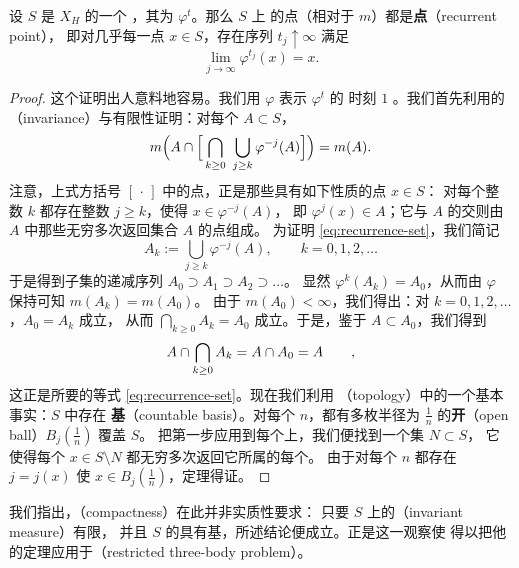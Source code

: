 \begin{theorem}\label{thm:poincare-recurrence}
设 $S$ 是\trHamiltonianVectorField{} $X_{H}$ 的一个%
\trCompact\trRegular\trEnergySurface，其\trFlow{}为 $\varphi^{t}$。那么 $S$ 上%
\trAlmostEvery{}的点（相对于 $m$）都是\textbf{\trRecurrence{}点}（recurrent point），%
即对几乎每一点 $x\in S$，存在序列 $t_{j}\uparrow\infty$ 满足
\[
\lim_{j\to\infty}\varphi^{t_{j}}(x)=x.
\]
\end{theorem}
\begin{proof}
这个证明出人意料地容易。我们用 $\varphi$ 表示\trFlow{} $\varphi^{t}$ 的%
时刻 $1$ \trMapping。我们首先利用\trMeasure{}的%
\textbf{\trInvariance}（invariance）与有限性证明：对每个 $A\subset S$，
\begin{equation}\label{eq:recurrence-set}
m\Bigl(A\cap\Bigl[\,\bigcap_{k\geq0}\ \bigcup_{j\geq k}\varphi^{-j}(A)\Bigr]\Bigr)=m(A).
\end{equation}
注意，上式方括号 $[\,\cdot\,]$ 中的点，正是那些具有如下性质的点 $x\in S$：%
对每个整数 $k$ 都存在整数 $j\geq k$，使得 $x\in\varphi^{-j}(A)$，%
即 $\varphi^{j}(x)\in A$；它与 $A$ 的交则由 $A$ 中那些无穷多次返回集合 $A$ 的点组成。%
为证明 \eqref{eq:recurrence-set}，我们简记
\[
A_{k}:=\bigcup_{j\geq k}\varphi^{-j}(A),\qquad k=0,1,2,\dots
\]
于是得到子集的递减序列 $A_{0}\supset A_{1}\supset A_{2}\supset\dots$。%
显然 $\varphi^{k}(A_{k})=A_{0}$，从而由 $\varphi$ 保持\trMeasure{}可知 $m(A_{k})=m(A_{0})$。%
由于 $m(A_{0})<\infty$，我们得出：对 $k=0,1,2,\dots$，$A_{0}=A_{k}$ \trAlmostEverywhere{}成立，%
从而 $\bigcap_{k\geq0}A_{k}=A_{0}$ \trAlmostEverywhere{}成立。于是，鉴于 $A\subset A_{0}$，我们得到
\[
A\cap\bigcap_{k\geq0}A_{k}=A\cap A_{0}=A\qquad\text{\trAlmostEverywhere},
\]
这正是所要的等式 \eqref{eq:recurrence-set}。现在我们利用%
\textbf{\trTopology}（topology）中的一个基本事实：$S$ 中存在%
\textbf{\trCountable{}基}（countable basis）。对每个 $n$，都有\trCountable{}多枚半径为%
$\tfrac{1}{n}$ 的\textbf{开\trBall}（open ball）$B_{j}(\tfrac{1}{n})$ 覆盖 $S$。%
把第一步应用到每个\trBall{}上，我们便找到一个\trMeasureZero{}集 $N\subset S$，%
它使得每个 $x\in S\setminus N$ 都无穷多次返回它所属的每个\trBall{}。%
由于对每个 $n$ 都存在 $j=j(x)$ 使 $x\in B_{j}(\tfrac{1}{n})$，定理得证。
\end{proof}

我们指出，\textbf{\trCompactness}（compactness）在此并非实质性要求：%
只要 $S$ 上的\textbf{\trInvariantMeasure}（invariant measure）有限，%
并且 $S$ 的\trTopology{}具有\trCountable{}基，所述结论便成立。正是这一观察使%
\trPoincare{}得以把他的定理应用于\textbf{\trRestrictedThreeBodyProblem}（restricted
three-body problem）。


